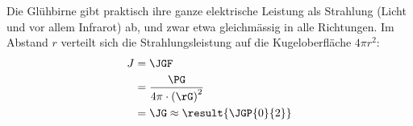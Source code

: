 Die Glühbirne gibt praktisch ihre ganze elektrische Leistung als Strahlung (Licht und vor allem Infrarot) ab, und zwar etwa gleichmässig in alle Richtungen. Im Abstand $r$ verteilt sich die Strahlungsleistung auf die Kugeloberfläche $4\pi r^2$:
\begin{align}
 J &= \JGF \\
   &= \frac{\PG}{4\pi\cdot\left(\rG\right)^2} \\
   &= \JG \approx \result{\JGP{0}{2}}
\end{align}
